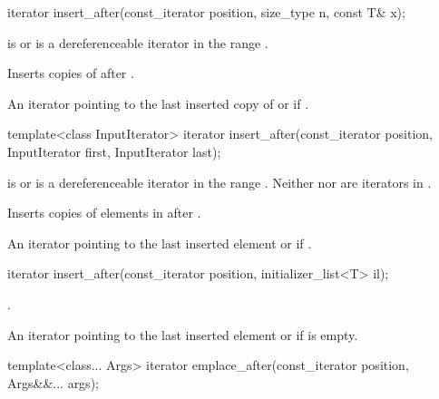 %
\begin{itemdecl}
iterator insert_after(const_iterator position, size_type n, const T& x);
\end{itemdecl}

\begin{itemdescr}
\pnum
\expects
{} is  or is a dereferenceable
iterator in the range .

\pnum
\effects
Inserts  copies of  after .

\pnum
\returns
An iterator pointing to the last inserted copy of  or  if .
\end{itemdescr}

%
\begin{itemdecl}
template<class InputIterator>
  iterator insert_after(const_iterator position, InputIterator first, InputIterator last);
\end{itemdecl}

\begin{itemdescr}
\pnum
\expects
{} is  or is a dereferenceable
iterator in the range .
Neither  nor  are iterators in .

\pnum
\effects
Inserts copies of elements in  after .

\pnum
\returns
An iterator pointing to the last inserted element or  if .
\end{itemdescr}

%
\begin{itemdecl}
iterator insert_after(const_iterator position, initializer_list<T> il);
\end{itemdecl}

\begin{itemdescr}
\pnum
\effects
{}.

\pnum
\returns
An iterator pointing to the last inserted element or  if  is empty.
\end{itemdescr}


%
\begin{itemdecl}
template<class... Args>
  iterator emplace_after(const_iterator position, Args&&... args);
\end{itemdecl}

